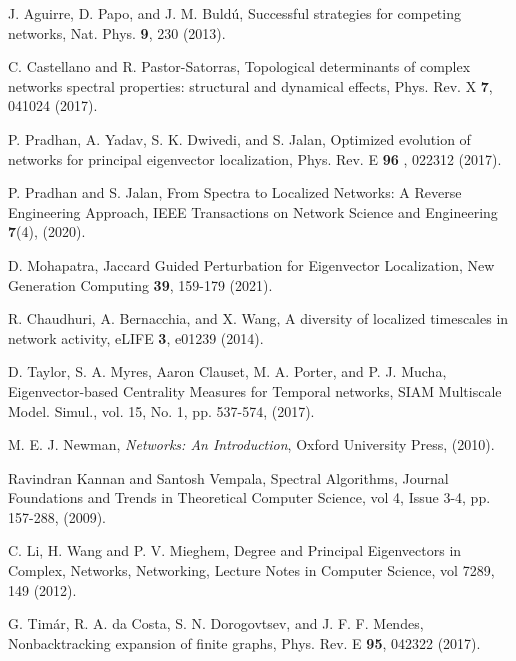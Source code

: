 \documentclass[envcountreset,oribibl]{llncs}
\begin{document}
\begin{thebibliography}{0}


 J. Aguirre, D. Papo, and J. M. Buld\'{u}, Successful strategies for competing networks, Nat. Phys. {\bf 9}, 230 (2013).

 C. Castellano and R. Pastor-Satorras, Topological determinants of complex networks spectral properties: structural and dynamical effects, Phys. Rev. X {\bf 7}, 041024 (2017).

 P. Pradhan, A. Yadav, S. K. Dwivedi, and S. Jalan, Optimized evolution of networks for principal eigenvector localization, Phys. Rev. E {\bf 96} , 022312 (2017).

 P. Pradhan and S. Jalan, From Spectra to Localized Networks: A Reverse Engineering Approach, IEEE Transactions on Network Science and Engineering {\bf 7}(4), (2020).

 D. Mohapatra, Jaccard Guided Perturbation for Eigenvector Localization, New Generation Computing {\bf 39}, 159-179 (2021).

 R. Chaudhuri, A. Bernacchia, and X. Wang, A diversity of localized timescales in network activity, eLIFE {\bf 3}, e01239 (2014).

 D. Taylor, S. A. Myres, Aaron Clauset, M. A. Porter, and P. J. Mucha, Eigenvector-based Centrality Measures for 
Temporal networks, SIAM Multiscale Model. Simul., vol. 15, No. 1, pp. 537-574, (2017).

 M. E. J. Newman, \emph{Networks: An Introduction}, Oxford University Press, (2010). 

 Ravindran Kannan and Santosh Vempala, Spectral Algorithms, Journal Foundations and Trends in Theoretical Computer Science, vol 4, Issue 3-4, pp. 157-288, (2009).

 C. Li, H. Wang and P. V. Mieghem, Degree and Principal Eigenvectors in Complex, Networks, Networking, Lecture Notes in Computer Science, vol 7289, 149 (2012).

 G. Tim\'{a}r, R. A. da Costa, S. N. Dorogovtsev, and J. F. F. Mendes, Nonbacktracking expansion of finite graphs, Phys. Rev. E {\bf 95}, 042322 (2017).


\end{thebibliography}
\end{document}
